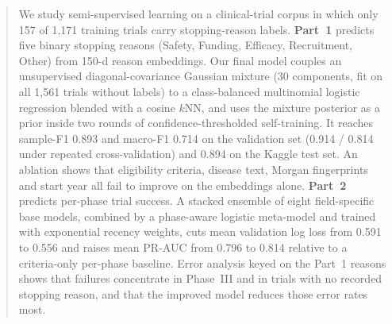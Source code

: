 \begin{abstract}
We study semi-supervised learning on a clinical-trial corpus in which only 157 of
1,171 training trials carry stopping-reason labels. \textbf{Part~1} predicts five
binary stopping reasons (Safety, Funding, Efficacy, Recruitment, Other) from 150-d
reason embeddings. Our final model couples an unsupervised diagonal-covariance
Gaussian mixture (30 components, fit on all 1,561 trials without labels) to a
class-balanced multinomial logistic regression blended with a cosine $k$NN, and
uses the mixture posterior as a prior inside two rounds of confidence-thresholded
self-training. It reaches sample-F1 0.893 and macro-F1 0.714 on the validation set
(0.914 / 0.814 under repeated cross-validation) and 0.894 on the Kaggle test set.
An ablation shows that eligibility criteria, disease text, Morgan fingerprints and
start year all fail to improve on the embeddings alone. \textbf{Part~2} predicts
per-phase trial success. A stacked ensemble of eight field-specific base models,
combined by a phase-aware logistic meta-model and trained with exponential recency
weights, cuts mean validation log loss from 0.591 to 0.556 and raises mean PR-AUC
from 0.796 to 0.814 relative to a criteria-only per-phase baseline. Error analysis
keyed on the Part~1 reasons shows that failures concentrate in Phase~III and in
trials with no recorded stopping reason, and that the improved model reduces those
error rates most.
\end{abstract}
